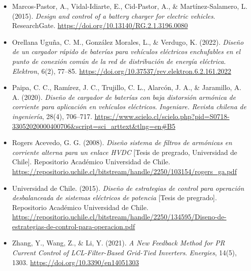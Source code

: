 \begin{itemize}
  \item Marcos-Pastor, A., Vidal-Idiarte, E., Cid-Pastor, A., \& Mart\'inez-Salamero, L. (2015). \textit{Design and control of a battery charger for electric vehicles}. ResearchGate. \url{https://doi.org/10.13140/RG.2.1.3196.0080}
  
  \item Orellana Ugu\~na, C. M., Gonz\'alez Morales, L., \& Verdugo, K. (2022). \textit{Dise\~no de un cargador r\'apido de bater\'ias para veh\'iculos el\'ectricos enchufables en el punto de conexi\'on com\'un de la red de distribuci\'on de energ\'ia el\'ectrica}. \textit{Elektron}, 6(2), 77–85. \url{https://doi.org/10.37537/rev.elektron.6.2.161.2022}
  
  \item Paipa, C. C., Ram\'irez, J. C., Trujillo, C. L., Alarc\'on, J. A., \& Jaramillo, A. A. (2020). \textit{Dise\~no de cargador de bater\'ias con baja distorsi\'on arm\'onica de corriente para aplicaci\'on en veh\'iculos el\'ectricos}. \textit{Ingeniare. Revista chilena de ingenier\'ia}, 28(4), 706–717. \url{https://www.scielo.cl/scielo.php?pid=S0718-33052020000400706&script=sci_arttext&tlng=en#B5}
  
  \item Rogers Acevedo, G. G. (2008). \textit{Dise\~no sistema de filtros de arm\'onicas en corriente alterna para un enlace HVDC} [Tesis de pregrado, Universidad de Chile]. Repositorio Acad\'emico Universidad de Chile. \url{https://repositorio.uchile.cl/bitstream/handle/2250/103154/rogers_ga.pdf}
  
  \item Universidad de Chile. (2015). \textit{Dise\~no de estrategias de control para operaci\'on desbalanceada de sistemas el\'ectricos de potencia} [Tesis de pregrado]. Repositorio Acad\'emico Universidad de Chile. \url{https://repositorio.uchile.cl/bitstream/handle/2250/134595/Diseno-de-estrategias-de-control-para-operacion.pdf}
  
  \item Zhang, Y., Wang, Z., \& Li, Y. (2021). \textit{A New Feedback Method for PR Current Control of LCL-Filter-Based Grid-Tied Inverters}. \textit{Energies}, 14(5), 1303. \url{https://doi.org/10.3390/en14051303}
\end{itemize}
